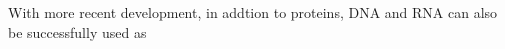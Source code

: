 With more recent development, in addtion to proteins, DNA and RNA can also be successfully used as 
